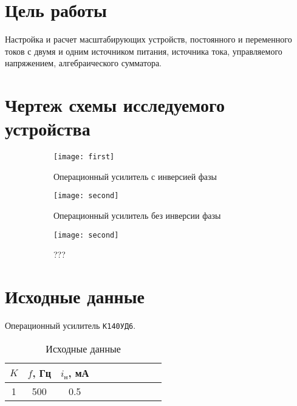 





\section{Цель работы}

Настройка и расчет масштабирующих устройств, постоянного и переменного токов с двумя и одним источником питания, источника тока, управляемого напряжением, алгебраического сумматора.

\section{Чертеж схемы исследуемого устройства}

\begin{figure}[H]
\begin{center}
	\begin{subfigure}[b]{0.3\textwidth}
		\texttt{[image: first]}
		\caption{Операционный усилитель с инверсией фазы}
	\end{subfigure}
	\begin{subfigure}[b]{0.3\textwidth}
		\texttt{[image: second]}
		\caption{Операционный усилитель без инверсии фазы}
	\end{subfigure}
	\begin{subfigure}[b]{0.3\textwidth}
		\texttt{[image: second]}
		\captionsetup{justification=centering}
		\caption{???}
	\end{subfigure}
	\caption{}
\end{center}
\end{figure}


\section{Исходные данные}

Операционный усилитель \verb+К140УД6+.

\begin{table}[H]
\begin{center}
	\caption{Исходные данные}
	\def\tabcolsep{50pt}
	\begin{tabular}{|c|c|c|c|c|c|c|c|c|c|}
		\hline
		$K$ &
		$f$, Гц &
		$i_\text{н}$, мА \\
		\hline
		1 &
		500 &
		0.5 \\
	    \hline	
	\end{tabular}
	\label{tabular:1}
\end{center}
\end{table}

